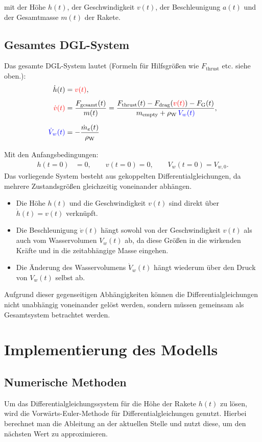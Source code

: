 \documentclass{SimSemBericht} %
\begin{document}
mit der Höhe \(h(t)\), der Geschwindigkeit \(v(t)\), der Beschleunigung \(a(t)\) und der Gesamtmasse \(m(t)\) der Rakete.

\subsection{Gesamtes DGL-System}
Das gesamte DGL-System lautet (Formeln für Hilfsgrößen wie \(F_{\mathrm{thrust}}\) etc. siehe oben.):
\begin{align*}
    \dot h(t) &= \textcolor{red}{v(t)},\\[4pt]
    \textcolor{red}{\dot v(t)} &= \dfrac{F_{\mathrm{gesamt}}(t)}{m(t)} = \dfrac{F_{\mathrm{thrust}}(t) - F_{\mathrm{drag}}(\textcolor{red}{v(t)}) - F_{\mathrm{G}}(t)}{m_{\mathrm{empty}} + \rho_{\mathrm{W}}\,\textcolor{blue}{V_w(t)}},\\[6pt]
    \textcolor{blue}{\dot V_w(t)} &= -\dfrac{\dot m_e(t)}{\rho_{\mathrm{W}}}\\[6pt]
\end{align*}
Mit den Anfangsbedingungen:
\begin{align*}
h(t=0)&=0,\qquad v(t=0)=0,\qquad V_w(t=0)=V_{w,0}.
\end{align*}
Das vorliegende System besteht aus gekoppelten Differentialgleichungen, da mehrere Zustandsgrößen gleichzeitig voneinander abhängen.

\begin{itemize}
    \item Die Höhe \(h(t)\) und die Geschwindigkeit \(v(t)\) sind direkt über \(\dot h(t) = v(t)\) verknüpft.
    \item Die Beschleunigung \(\dot v(t)\) hängt sowohl von der Geschwindigkeit \(v(t)\) als auch vom Wasservolumen \(V_w(t)\) ab, da diese Größen in die wirkenden Kräfte und in die zeitabhängige Masse eingehen.
    \item Die Änderung des Wasservolumens \(\dot V_w(t)\) hängt wiederum über den Druck von \(V_w(t)\) selbst ab.
\end{itemize}

Aufgrund dieser gegenseitigen Abhängigkeiten können die Differentialgleichungen nicht unabhängig voneinander gelöst werden, sondern müssen gemeinsam als Gesamtsystem betrachtet werden.


\section{Implementierung des Modells}
\subsection{Numerische Methoden}
Um das Differentialgleichungssystem für die Höhe der Rakete \(h(t)\) zu lösen, wird die Vorwärts-Euler-Methode für Differentialgleichungen genutzt.
Hierbei berechnet man die Ableitung an der aktuellen Stelle und nutzt diese, um den nächsten Wert zu approximieren.
\end{document}
